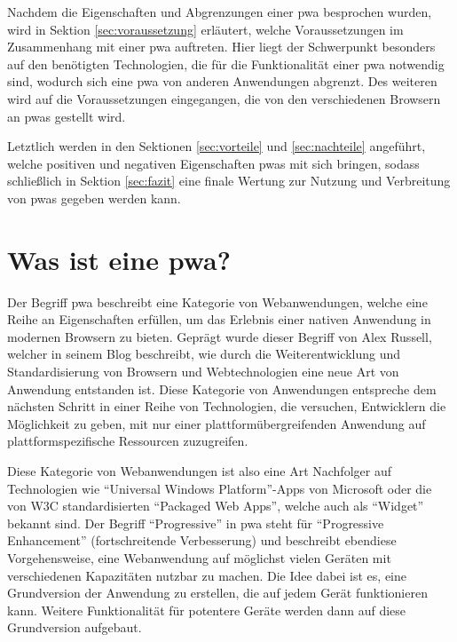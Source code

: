 \documentclass[12pt, parskip=half]{scrartcl}       %
\begin{document}
Nachdem die Eigenschaften und Abgrenzungen einer \ac{pwa} besprochen wurden, wird in Sektion \ref{sec:voraussetzung} erläutert, welche Voraussetzungen im Zusammenhang mit einer \ac{pwa} auftreten.
Hier liegt der Schwerpunkt besonders auf den benötigten Technologien, die für die Funktionalität einer \ac{pwa} notwendig sind, wodurch sich eine \ac{pwa} von anderen Anwendungen abgrenzt.
Des weiteren wird auf die Voraussetzungen eingegangen, die von den verschiedenen Browsern an \acp{pwa} gestellt wird.

Letztlich werden in den Sektionen \ref{sec:vorteile} und \ref{sec:nachteile} angeführt, welche positiven und negativen Eigenschaften \acp{pwa} mit sich bringen, sodass schließlich in Sektion \ref{sec:fazit} eine finale Wertung zur Nutzung und Verbreitung von \acp{pwa} gegeben werden kann.


\newpage

\section{Was ist eine \ac{pwa}?}
\label{sec:wasistpwa}



Der Begriff \acl{pwa} beschreibt eine Kategorie von Webanwendungen, welche eine Reihe an Eigenschaften erfüllen, um das Erlebnis einer nativen Anwendung in modernen Browsern zu bieten.
Geprägt wurde dieser Begriff von Alex Russell, welcher in seinem Blog\cite{russell_pwaescapingtabs} beschreibt, wie durch die Weiterentwicklung und Standardisierung von Browsern und Webtechnologien eine neue Art von Anwendung entstanden ist.
Diese Kategorie von Anwendungen entspreche dem nächsten Schritt in einer Reihe von Technologien, die versuchen, Entwicklern die Möglichkeit zu geben, mit nur einer plattformübergreifenden Anwendung auf plattformspezifische Ressourcen zuzugreifen.

Diese Kategorie von Webanwendungen ist also eine Art Nachfolger auf Technologien wie \enquote{Universal Windows Platform}-Apps\cite{msdocs_uwp} von Microsoft oder die von W3C standardisierten \enquote{Packaged Web Apps}\cite{w3c_packagedwebapps}, welche auch als \enquote{Widget} bekannt sind.
Der Begriff \enquote{Progressive} in \acl{pwa} steht für \enquote{Progressive Enhancement} (fortschreitende Verbesserung) und beschreibt ebendiese Vorgehensweise, eine Webanwendung auf möglichst vielen Geräten mit verschiedenen Kapazitäten nutzbar zu machen.
Die Idee dabei ist es, eine Grundversion der Anwendung zu erstellen, die auf jedem Gerät funktionieren kann.
Weitere Funktionalität für potentere Geräte werden dann auf diese Grundversion aufgebaut.
\end{document}
